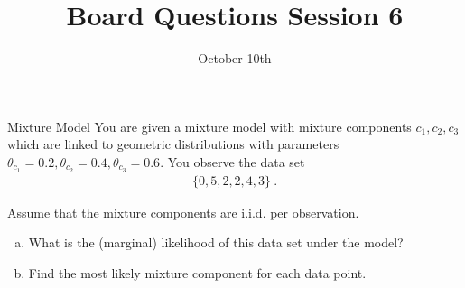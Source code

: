 \documentclass{beamer}
\title{Board Questions Session 6}
\date{October 10th}
\begin{document}
\begin{frame}{Mixture Model}
\small
You are given a mixture model with mixture components $ c_{1},c_{2},c_{3} $ which are linked to geometric
distributions with parameters $ \theta_{c_{1}} = 0.2, \theta_{c_{2}} = 0.4, \theta_{c_{3}} = 0.6 $. You
observe the data set
\begin{align*}
\{0, 5, 2, 2, 4, 3\} \ .
\end{align*}

Assume that the mixture components are i.i.d. per observation.
\begin{enumerate}[a)]
\item What is the (marginal) likelihood of this data set under the model?
\item Find the most likely mixture component for each data point.
\end{enumerate}
\end{frame}
\end{document}
